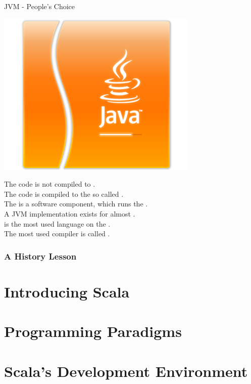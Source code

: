 \begin{frame}{JVM - People's Choice}
\begin{center}
\includegraphics[scale=0.25]{resources/JVM.png}
\end{center}
The code is \alert{not} compiled to .\\
The code is compiled to the so called .\\
The  is a software component, which runs the
.\\
A JVM implementation exists for almost .\\
 is the most used language on the .\\
The most used  compiler is called . 
\end{frame}


\section{A History Lesson}

\part[Introducing Scala]{Introducing Scala}
\part[Programming Paradigms]{Programming Paradigms}
\part[Scala's Development Environment]{Scala's Development Environment}
